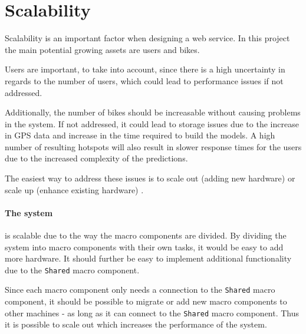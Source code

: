 \section{Scalability}
Scalability is an important factor when designing a web service. In this project the main potential growing assets are users and bikes.

Users are important, to take into account, since there is a high uncertainty in regards to the number of users, which could lead to performance issues if not addressed.

Additionally, the number of bikes should be increasable without causing problems in the system. If not addressed, it could lead to storage issues due to the increase in GPS data and increase in the time required to build the models.
A high number of resulting hotspots will also result in slower response times for the users due to the increased complexity of the predictions.

The easiest way to address these issues is to scale out (adding new hardware) or scale up (enhance existing hardware) \cite{michael2007scale}. 

\paragraph{The system} is scalable due to the way the macro components are divided. By dividing the system into macro components with their own tasks, it would be easy to add more hardware. It should further be easy to implement additional functionality due to the \texttt{Shared} macro component.

Since each macro component only needs a connection to the \texttt{Shared} macro component, it should be possible to migrate or add new macro components to other machines - as long as it can connect to the \texttt{Shared} macro component. Thus it is possible to scale out which increases the performance of the system.

